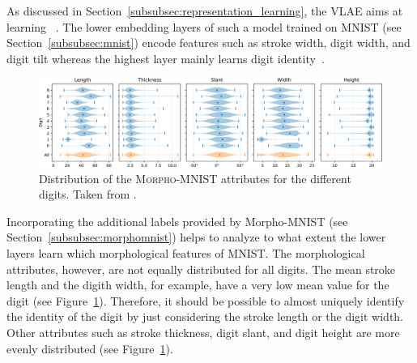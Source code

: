 As discussed in Section~\ref{subsubsec:representation_learning}, the \acl{VLAE} aims at learning ~\citep{zhao2017learning}.
The lower embedding layers of such a model trained on MNIST (see Section~\ref{subsubsec:mnist}) encode features such as stroke width, digit width, and digit tilt whereas the highest layer mainly learns digit identity~\citep{zhao2017learning}.

\begin{figure}
    \centering
    \includegraphics[width=\textwidth]{images/morpho_mnist_distribution.png}
    \caption{Distribution of the \textsc{Morpho-MNIST} attributes for the different digits. Taken from \citep{castro2019morpho}.}
    \label{fig:morpho_mnist_distribution}
\end{figure}

Incorporating the additional labels provided by Morpho-\textsc{MNIST} (see Section~\ref{subsubsec:morphomnist}) helps to analyze to what extent the lower layers learn which morphological features of \textsc{MNIST}.
The morphological attributes, however, are not equally distributed for all digits.
The mean stroke length and the digith width, for example, have a very low mean value for the digit  (see Figure~\ref{fig:morpho_mnist_distribution}).
Therefore, it should be possible to almost uniquely identify the identity of the digit  by just considering the stroke length or the digit width.
Other attributes such as stroke thickness, digit slant, and digit height are more evenly distributed (see Figure~\ref{fig:morpho_mnist_distribution}).


